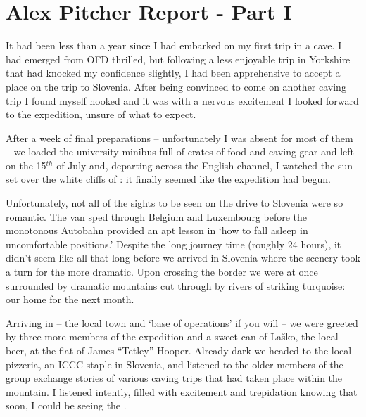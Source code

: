 \section{Alex Pitcher Report - Part I}


It had been less than a year since I had embarked on my first trip in a
cave. I had emerged from OFD thrilled, but following a less enjoyable trip in Yorkshire that had knocked my confidence slightly, I had been apprehensive to accept a place on the trip to Slovenia. After being convinced to come on another caving trip I found myself hooked and it was with a nervous excitement I looked forward to the expedition, unsure of what to expect.

After a week of final preparations -- unfortunately I was absent for most
of them -- we loaded the university minibus full of crates of food and
caving gear and left  on the 15\(^{th}\) of July and, departing
across the English channel, I watched the sun set over the white cliffs
of : it finally seemed like the expedition had begun.

Unfortunately, not all of the sights to be seen on the drive to Slovenia
were so romantic. The van sped through Belgium and Luxembourg before the
monotonous Autobahn provided an apt lesson in `how to fall asleep in
uncomfortable positions.' Despite the long journey time (roughly 24
hours), it didn't seem like all that long before we arrived in Slovenia
where the scenery took a turn for the more dramatic. Upon crossing the
border we were at once surrounded by dramatic mountains cut through by
rivers of striking turquoise: our home for the next month.

Arriving in  -- the local town and `base of operations' if you will --
we were greeted by three more members of the expedition and a sweet can
of Laško, the local beer, at the flat of James ``Tetley'' Hooper.
Already dark we headed to the local pizzeria, an ICCC staple in
Slovenia, and listened to the older members of the group exchange
stories of various caving trips that had taken place within the
mountain. I listened intently, filled with excitement and trepidation
knowing that soon, I could be seeing the .


